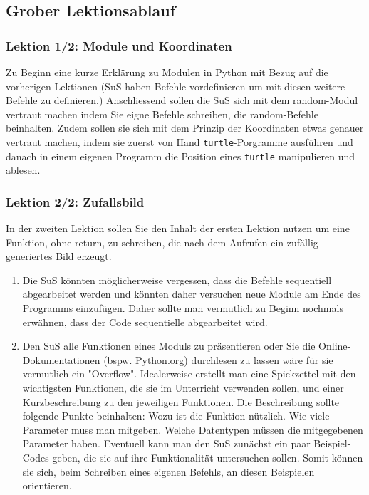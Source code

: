 \begin{myExBox}[title=DL \themycounter]
\subsection*{Grober Lektionsablauf}
\subsubsection*{Lektion 1/2: Module und Koordinaten}
Zu Beginn eine kurze Erklärung zu Modulen in Python mit Bezug auf die vorherigen Lektionen (SuS haben Befehle vordefinieren um mit diesen weitere Befehle zu definieren.) Anschliessend sollen die SuS sich mit dem random-Modul vertraut machen indem Sie eigne Befehle schreiben, die random-Befehle beinhalten. Zudem sollen sie sich mit dem Prinzip der Koordinaten etwas genauer vertraut machen, indem sie zuerst von Hand \lstinline|turtle|-Porgramme ausführen und danach in einem eigenen Programm die Position eines \lstinline|turtle| manipulieren und ablesen.

\subsubsection*{Lektion 2/2: Zufallsbild}
In der zweiten Lektion sollen Sie den Inhalt der ersten Lektion nutzen um eine Funktion, ohne return, zu schreiben, die nach dem Aufrufen ein zufällig generiertes Bild erzeugt.


\begin{myExBox}[title=Mögliche Schwierigkeiten \& geeignete Massnahmen]
\begin{enumerate}
    \item Die SuS könnten möglicherweise vergessen, dass die Befehle sequentiell abgearbeitet werden und könnten daher versuchen neue Module am Ende des Programms einzufügen. Daher sollte man vermutlich zu Beginn nochmals erwähnen, dass der Code sequentielle abgearbeitet wird.
    \item Den SuS alle Funktionen eines Moduls zu präsentieren oder Sie die Online-Dokumentationen (bspw. \href{https://docs.python.org/3/library/random.html}{Python.org}) durchlesen zu lassen wäre für sie vermutlich ein "Overflow". Idealerweise erstellt man eine Spickzettel mit den wichtigsten Funktionen, die sie im Unterricht verwenden sollen, und einer Kurzbeschreibung zu den jeweiligen Funktionen. Die Beschreibung sollte folgende Punkte beinhalten: Wozu ist die Funktion nützlich. Wie viele Parameter muss man mitgeben. Welche Datentypen müssen die mitgegebenen Parameter haben. Eventuell kann man den SuS zunächst ein paar Beispiel-Codes geben, die sie auf ihre Funktionalität untersuchen sollen. Somit können sie sich, beim Schreiben eines eigenen Befehls, an diesen Beispielen orientieren.
\end{enumerate}
\end{myExBox}
\end{myExBox}
\newpage{}

